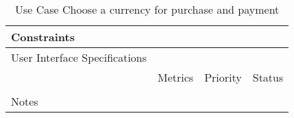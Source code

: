 \begin{table}[H]
\begin{tabularx}{\linewidth}{|l|X|X|X|}
    \hline Constraints                   & \multicolumn{3}{l|}{}                                                                                 \\

    \hline User Interface Specifications & \multicolumn{3}{l|}{}                                                                                 \\

    \hline \multirow{2}{*}{}             & Metrics                                                                           & Priority & Status \\
    \cline{2-4}                          &                                                                                   &          &        \\
    \hline Notes                         & \multicolumn{3}{l|}{}                                                                                 \\
    \hline
  \end{tabularx}
  \caption{Use Case Choose a currency for purchase and payment}
  \label{tab:use_case_choose_a_currency_for_purchase_and_payment}
\end{table}

